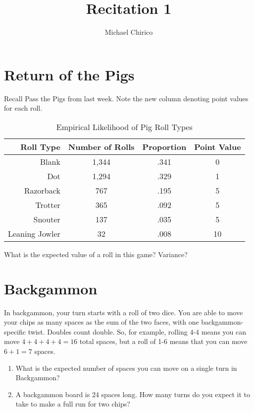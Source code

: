 \documentclass{article}
\begin{document}
\title{Recitation 1}
\author{Michael Chirico}

\maketitle

\section{Return of the Pigs}

Recall Pass the Pigs from last week. Note the new column denoting point values for each roll.

\begin{table}[htbp]
\centering
\begin{tabular}{|r|c|c|c|}
\hline
Roll Type & Number of Rolls & Proportion & Point Value \\
\hline
Blank & 1,344 & .341 & 0 \\
\hline
Dot & 1,294 & .329 & 1 \\
\hline
Razorback & 767 & .195 & 5 \\
\hline
Trotter & 365 & .092 & 5 \\
\hline
Snouter & 137 & .035 & 5 \\
\hline
Leaning Jowler & 32 & .008 & 10 \\
\hline
\end{tabular}
\caption{Empirical Likelihood of Pig Roll Types}
\label{tbl:pigout}
\end{table}

What is the expected value of a roll in this game? Variance?

\section{Backgammon}

In backgammon, your turn starts with a roll of two dice. You are able to move your chips as many spaces as the sum of the two faces, with one backgammon-specific twist. Doubles count double. So, for example, rolling 4-4 means you can move $4+4+4+4=16$ total spaces, but a roll of 1-6 means that you can move $6+1=7$ spaces.

\begin{enumerate}
\item What is the expected number of spaces you can move on a single turn in Backgammon?
\item A backgammon board is 24 spaces long. How many turns do you expect it to take to make a full run for two chips?
\end{enumerate}
\end{document}
